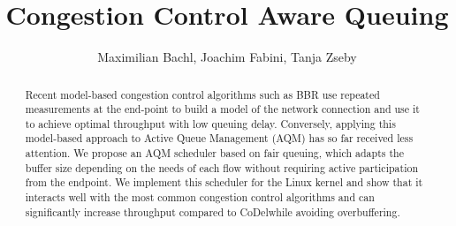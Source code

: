\documentclass[10pt,sigconf,letterpaper,dvipsnames\ifx\removeHeaders\tempYes ,nonacm\fi]{acmart}
\newcommand{\codel}{CoDel}
\begin{document}
\title{Congestion Control Aware Queuing}



\begin{abstract}
Recent model-based congestion control algorithms such as BBR use repeated measurements at the end-point to build a model of the network connection and use it to achieve optimal throughput with low queuing delay. Conversely, applying this model-based approach to Active Queue Management (AQM) has so far received less attention. We propose an AQM scheduler based on fair queuing, which adapts the buffer size depending on the needs of each flow without requiring active participation from the endpoint. We implement this scheduler for the Linux kernel and show that it interacts well with the most common congestion control algorithms and can significantly increase throughput compared to \codel while avoiding overbuffering.
\end{abstract}

\author{Maximilian Bachl, Joachim Fabini, Tanja Zseby}



\end{document}
